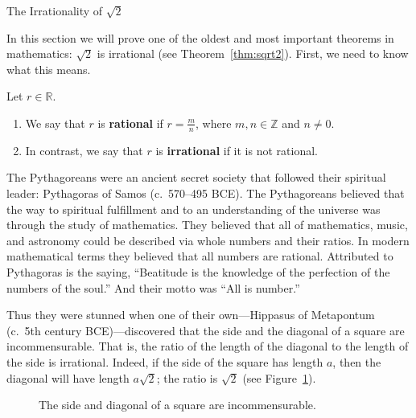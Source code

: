 \begin{section}{The Irrationality of $\sqrt{2}$}\label{sec:irrationality of root 2}

In this section we will prove one of the oldest and most important theorems in mathematics: $\sqrt{2}$ is irrational (see Theorem~\ref{thm:sqrt2}). First, we need to know what this means.

\begin{definition}
Let $r\in\mathbb{R}$.
\begin{enumerate}[label=\textrm{(\alph*)}]
\item We say that $r$ is \textbf{rational} if $r=\frac{m}{n}$, where $m,n\in\mathbb{Z}$ and $n\neq 0$.
\item In contrast, we say that $r$ is \textbf{irrational} if it is not rational.
\end{enumerate} 
\end{definition}

The Pythagoreans were an ancient secret society that followed their spiritual leader: Pythagoras of Samos (c.\ 570--495 BCE). The Pythagoreans believed that the way to spiritual fulfillment and to an understanding of the universe was through the study of mathematics. They believed that all of mathematics, music, and astronomy could be described via whole numbers and their ratios. In modern mathematical terms they believed that all numbers are rational. Attributed to Pythagoras is the saying, ``Beatitude is the knowledge of the perfection of the numbers of the soul.'' And their motto was ``All is number.''

Thus they were stunned when one of their own---Hippasus of Metapontum (c.~5th century BCE)---discovered that the side and the diagonal of a square are incommensurable. That is, the ratio of the length of the diagonal to the length of the side is irrational. Indeed, if the side of the square has length $a$, then the diagonal will have length $a\sqrt{2}$; the ratio is $\sqrt{2}$ (see Figure~\ref{fig:square}).

\begin{figure}[h!]
\centering
{}
\caption{The side and diagonal of a square are incommensurable.}\label{fig:square}
\end{figure}


\end{section}

